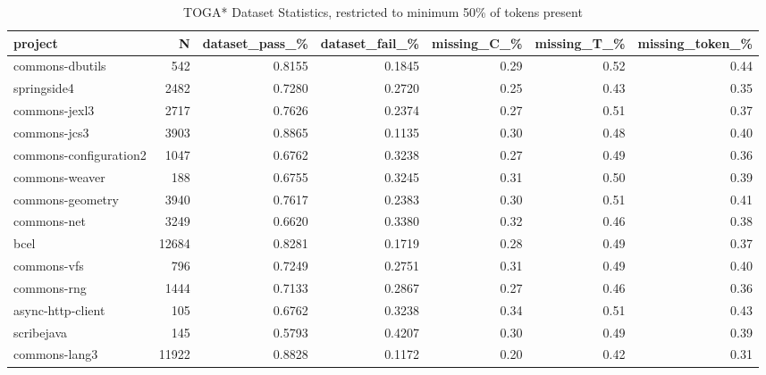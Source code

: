 \begin{table*}
\centering
\caption{TOGA* Dataset Statistics, restricted to minimum 50\% of tokens present}
\label{tab:toga_stats_50}
\begin{tabular}{lrrrrrr}
\toprule
                project &       N &  dataset\_pass\_\% &  dataset\_fail\_\% &  missing\_C\_\% &  missing\_T\_\% &  missing\_token\_\% \\
\midrule
        commons-dbutils &     542 &          0.8155 &          0.1845 &         0.29 &         0.52 &             0.44 \\
            springside4 &    2482 &          0.7280 &          0.2720 &         0.25 &         0.43 &             0.35 \\
          commons-jexl3 &    2717 &          0.7626 &          0.2374 &         0.27 &         0.51 &             0.37 \\
           commons-jcs3 &    3903 &          0.8865 &          0.1135 &         0.30 &         0.48 &             0.40 \\
 commons-configuration2 &    1047 &          0.6762 &          0.3238 &         0.27 &         0.49 &             0.36 \\
         commons-weaver &     188 &          0.6755 &          0.3245 &         0.31 &         0.50 &             0.39 \\
       commons-geometry &    3940 &          0.7617 &          0.2383 &         0.30 &         0.51 &             0.41 \\
            commons-net &    3249 &          0.6620 &          0.3380 &         0.32 &         0.46 &             0.38 \\
                   bcel &   12684 &          0.8281 &          0.1719 &         0.28 &         0.49 &             0.37 \\
            commons-vfs &     796 &          0.7249 &          0.2751 &         0.31 &         0.49 &             0.40 \\
            commons-rng &    1444 &          0.7133 &          0.2867 &         0.27 &         0.46 &             0.36 \\
      async-http-client &     105 &          0.6762 &          0.3238 &         0.34 &         0.51 &             0.43 \\
             scribejava &     145 &          0.5793 &          0.4207 &         0.30 &         0.49 &             0.39 \\
          commons-lang3 &   11922 &          0.8828 &          0.1172 &         0.20 &         0.42 &             0.31 \\

\end{tabular}
\end{table*}
